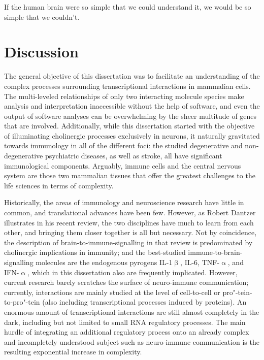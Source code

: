 \begin{savequote}[82mm]
If the human brain were so simple that we could understand it, we would be so simple that we couldn’t.
\end{savequote}

\chapter{Discussion}
The general objective of this dissertation was to facilitate an understanding of the complex processes surrounding transcriptional interactions in mammalian cells. The multi-leveled relationships of only two interacting molecule species make analysis and interpretation inaccessible without the help of software, and even the output of software analyses can be overwhelming by the sheer multitude of genes that are involved. Additionally, while this dissertation started with the objective of illuminating cholinergic processes exclusively in neurons, it naturally gravitated towards immunology in all of the different foci: the studied degenerative and non-degenerative psychiatric diseases, as well as stroke, all have significant immunological components. Arguably, immune cells and the central nervous system are those two mammalian tissues that offer the greatest challenges to the life sciences in terms of complexity. 

Historically, the areas of immunology and neuroscience research have little in common, and translational advances have been few. However, as Robert Dantzer illustrates in his recent review,\cite{Dantzer2018} the two disciplines have much to learn from each other, and bringing them closer together is all but necessary. Not by coincidence, the description of brain-to-immune-signalling in that review is predominated by cholinergic implications in immunity; and the best-studied immune-to-brain-signalling molecules are the endogenous pyrogens IL-1$\upbeta$, IL-6, TNF-$\upalpha$, and IFN-$\upalpha$, which in this dissertation also are frequently implicated. However, current research barely scratches the surface of neuro-immune communication; currently, interactions are mainly studied at the level of cell-to-cell or pro"-tein-to-pro"-tein (also including transcriptional processes induced by proteins). An enormous amount of transcriptional interactions are still almost completely in the dark, including but not limited to small RNA regulatory processes. The main hurdle of integrating an additional regulatory process onto an already complex and incompletely understood subject such as neuro-immune communication is the resulting exponential increase in complexity.


